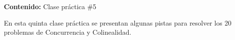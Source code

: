 {\Large
    \textbf{Contenido:} Clase práctica \#5
}

En esta quinta clase práctica se presentan algunas pistas para resolver los 20 problemas de Concurrencia y Colinealidad.